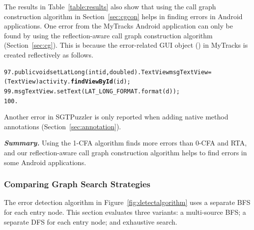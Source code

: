 The results in Table~\ref{table:results} also show that using the
call graph construction algorithm in Section~\ref{sec:cgcon}
helps in finding errors in Android applications. One error from the MyTracks Android application
can only be found by using the reflection-aware call graph construction algorithm (Section~\ref{sec:cg}).
This is because the error-related GUI object () in MyTracks is created
reflectively as follows.

{\vspace{2mm}
\hspace{3mm}{In class: com.google.android.apps.mytracks.StatsUtilities}
\vspace{-2mm}
\begin{CodeOut}
\begin{alltt}
97.  public void setLatLong(int id, double d) .    TextView msgTextView = (TextView) activity.\textbf{findViewById}(id);
99.    msgTextView.setText(LAT\_LONG\_FORMAT.format(d));
100. \ttrcb
\end{alltt}
\end{CodeOut}}

Another error in SGTPuzzler is only reported when adding native method
annotations (Section~\ref{sec:annotation}). 



\vspace{1mm}

\noindent \textbf{\textit{Summary.}} Using the 1-CFA 
algorithm finds more errors than 0-CFA and RTA, and our reflection-aware
call graph construction algorithm helps to find errors in some
Android applications.


\subsubsection{Comparing Graph Search Strategies}
\label{sec:search}

The error detection algorithm in Figure~\ref{fig:detectalgorithm} uses a
separate BFS for each entry node.  This section evaluates three variants:
a multi-source BFS; a separate DFS for each entry node; and exhaustive
search.

